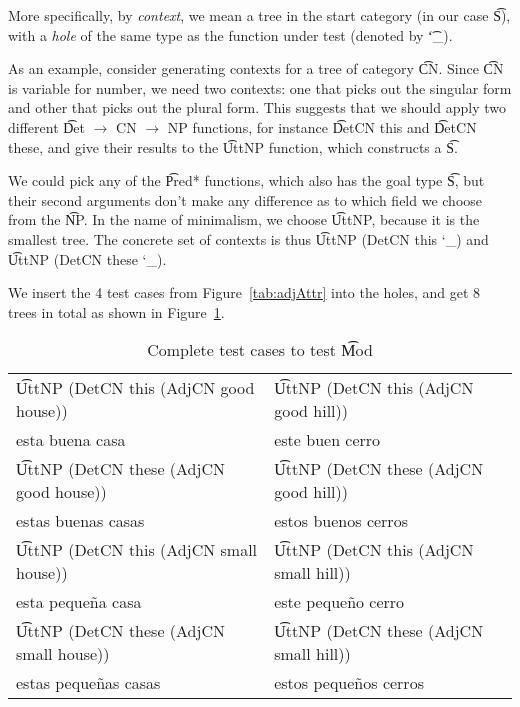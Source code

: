 More specifically, by \emph{context}, we mean a tree in the start category (in our case \t{S}), with a \emph{hole} of the same type as the function under test (denoted by \t{\char`_}).

As an example, consider generating contexts for a tree of category \t{CN}.
Since \t{CN} is variable for number, we need two contexts: 
one that picks out the singular form and other that picks out
the plural form. 
This suggests that we should apply two different
\t{Det $\rightarrow$ CN $\rightarrow$ NP} functions, for instance
\t{DetCN this} and \t{DetCN these}, and
give their results to the \t{UttNP} function, which constructs a \t{S}.

We could pick any of the \t{Pred*} functions, which also has the goal
type \t{S}, but their second arguments don't make any difference as to
which field we choose from the \t{NP}. In the name of minimalism, we
choose \t{UttNP}, because it is the smallest tree. The concrete set of
contexts is thus  \t{UttNP (DetCN this \char`_)}  and \t{UttNP (DetCN these \char`_)}.

We insert the 4 test cases from Figure~\ref{tab:adjAttr} into the
holes, and get 8 trees in total as shown in Figure~\ref{tab:testCases}.

\begin{table}
\centering
\begin{tabular}{| l | l |}
\hline
\t{UttNP (DetCN this
    (AdjCN good house))} & \t{UttNP (DetCN this
                                            (AdjCN good hill))} \\
esta buena casa          & este buen cerro \\ \hline
\t{UttNP (DetCN these
    (AdjCN good house))} & \t{UttNP (DetCN these
                                            (AdjCN good hill))} \\
estas buenas casas       & estos buenos cerros \\ \hline
\t{UttNP (DetCN this
    (AdjCN small house))} & \t{UttNP (DetCN this
                                            (AdjCN small hill))} \\
esta peque\~{n}a casa          & este peque\~{n}o cerro \\ \hline
\t{UttNP (DetCN these
    (AdjCN small house))} & \t{UttNP (DetCN these
                                            (AdjCN small hill))} \\
estas peque\~{n}as casas       & estos peque\~{n}os cerros \\ \hline
\end{tabular}
\caption{Complete test cases to test \t{Mod}}
\label{tab:testCases}
\end{table}

